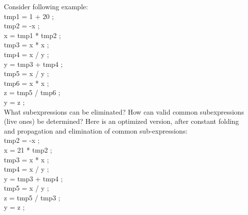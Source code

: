 \documentclass[11pt]{article}
\begin{document}
	\noindent
	Consider following example:\\
	tmp1 = 1 + 20 ;\\ tmp2 = -x ;\\ x = tmp1 * tmp2 ;\\ tmp3 = x * x ;\\ tmp4 = x / y ;\\ y = tmp3 + tmp4 ;\\ tmp5 = x / y ;\\ tmp6 = x * x ;\\ z = tmp5 / tmp6 ;\\ y = z ;\\
	What subexpressions can be eliminated? How can valid common subexpressions (live ones) be determined? Here is an optimized version, after constant folding and propagation and elimination of common sub-expressions:\\
	tmp2 = -x ;\\ x = 21 * tmp2 ; \\tmp3 = x * x ;\\ tmp4 = x / y ;\\ y = tmp3 + tmp4 ;\\ tmp5 = x / y ;\\ z = tmp5 / tmp3 ;\\ y = z ;\\
\end{document}
